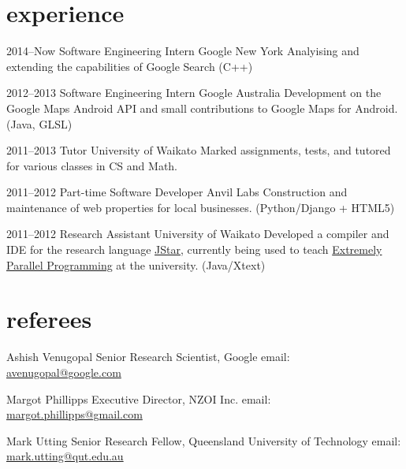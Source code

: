 \documentclass[]{boris-cv}
\begin{document}
\section{experience}

\begin{entrylist}
  \entry
    {2014--Now}
    {Software Engineering Intern}
    {Google New York}
    {Analyising and extending the capabilities of Google Search (C++)}

  \entry
    {2012--2013}
    {Software Engineering Intern}
    {Google Australia}
    {Development on the Google Maps Android API
    and small contributions to Google Maps for Android. (Java, GLSL)}

  \entry
    {2011--2013}
    {Tutor}
    {University of Waikato}
    {Marked assignments, tests, and tutored
    for various classes in CS and Math.}

  \entry
    {2011--2012}
    {Part-time Software Developer}
    {Anvil Labs}
    {Construction and maintenance of web properties for local businesses.
        (Python/Django + HTML5)}

  \entry
    {2011--2012}
    {Research Assistant}
    {University of Waikato}
    {Developed a compiler and IDE for the research language
    \href{http://www.cs.waikato.ac.nz/research/jstar/}{JStar}, currently being used to teach
    \href{http://papers.waikato.ac.nz/subjects/COMP/COMP553}
    {Extremely Parallel Programming} at the university. (Java/Xtext)}

\end{entrylist}


\section{referees}

  {Ashish Venugopal}
  {Senior Research Scientist, Google}
  {email: \href{mailto:avenugopal@google.com}{avenugopal@google.com}}

% 
  {Margot Phillipps}
  {Executive Director, NZOI Inc.}
  {email: \href{mailto:margot.phillipps@gmail.com}{margot.phillipps@gmail.com}}

  {Mark Utting}
  {Senior Research Fellow, Queensland University of Technology}
  {email: \href{mailto:mark.utting@qut.edu.au}{mark.utting@qut.edu.au}}
\end{document}
